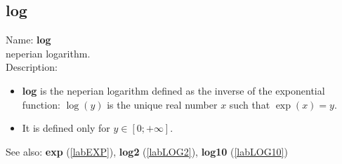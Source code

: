 \subsection{log}
\label{lablog}
\noindent Name: \textbf{log}\\
neperian logarithm.\\

\noindent Description: \begin{itemize}

\item \textbf{log} is the neperian logarithm defined as the inverse of the exponential
   function: $\log(y)$ is the unique real number $x$ such that $\exp(x)=y$.

\item It is defined only for $y \in [0; +\infty]$.
\end{itemize}
See also: \textbf{exp} (\ref{labEXP}), \textbf{log2} (\ref{labLOG2}), \textbf{log10} (\ref{labLOG10})
